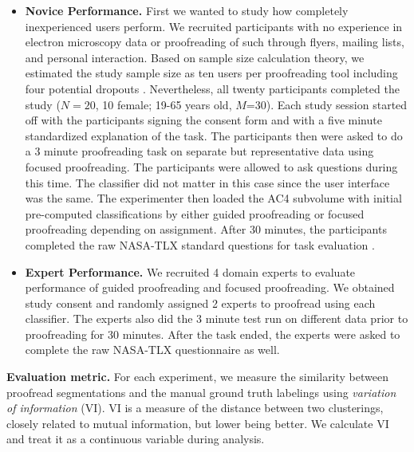 \begin{itemize}
\item \textbf{Novice Performance.} First we wanted to study how completely inexperienced users perform. We recruited participants with no experience in electron microscopy data or proofreading of such through flyers, mailing lists, and personal interaction. Based on sample size calculation theory, we estimated the study sample size as ten users per proofreading tool including four potential dropouts \cite{samplesize1, samplesize2}. Nevertheless, all twenty participants completed the study ($N=20$, 10 female; 19-65 years old, $M$=30). Each study session started off with the participants signing the consent form and with a five minute standardized explanation of the task. The participants then were asked to do a 3 minute proofreading task on separate but representative data using focused proofreading. The participants were allowed to ask questions during this time. The classifier did not matter in this case since the user interface was the same. The experimenter then loaded the AC4 subvolume with initial pre-computed classifications by either guided proofreading or focused proofreading depending on assignment. After 30 minutes, the participants completed the raw NASA-TLX standard questions for task evaluation \cite{NASATLX}.
\item \textbf{Expert Performance.} We recruited 4 domain experts to evaluate performance of guided proofreading and focused proofreading. We obtained study consent and randomly assigned 2 experts to proofread using each classifier. The experts also did the 3 minute test run on different data prior to proofreading for 30 minutes. After the task ended, the experts were asked to complete the raw NASA-TLX questionnaire as well.
\end{itemize}

\textbf{Evaluation metric.} For each experiment, we measure the similarity between proofread segmentations and the manual ground truth labelings using \textit{variation of information} (VI). VI is a measure of the distance between two clusterings, closely related to mutual information, but lower being better. We calculate VI and treat it as a continuous variable during analysis.



